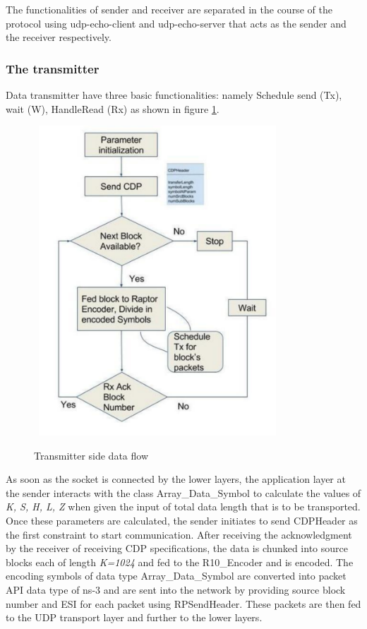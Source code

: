 The functionalities of sender and receiver are separated in the course of the protocol using udp-echo-client and udp-echo-server that acts as the sender and the receiver respectively.
\subsubsection{The transmitter}
Data transmitter have three basic functionalities: namely Schedule send (Tx), wait (W), HandleRead (Rx) as shown in figure \ref{sender_flow}. 
\begin{figure}[!htbp] 
\begin{center}
\mbox{
\includegraphics[width=3.5in]{Figures/rp_send}}
\caption{Transmitter side data flow}
\label{sender_flow}
\end{center}
\end{figure}
As soon as the socket is connected by the lower layers, the application layer at the sender interacts with the class Array\_Data\_Symbol to calculate the values of \textit{K, S, H, L, Z} when given the input of total data length that is to be transported. Once these parameters are calculated, the sender initiates to send CDPHeader as the first constraint to start communication. After receiving the acknowledgment by the receiver of receiving CDP specifications, the data is chunked into source blocks each of length \textit{K=1024} and fed to the R10\_Encoder and is encoded. The encoding symbols of data type Array\_Data\_Symbol are converted into packet API data type of ns-3 and are sent into the network by providing source block number and ESI for each packet using RPSendHeader. These packets are then fed to the UDP transport layer and further to the lower layers. 

